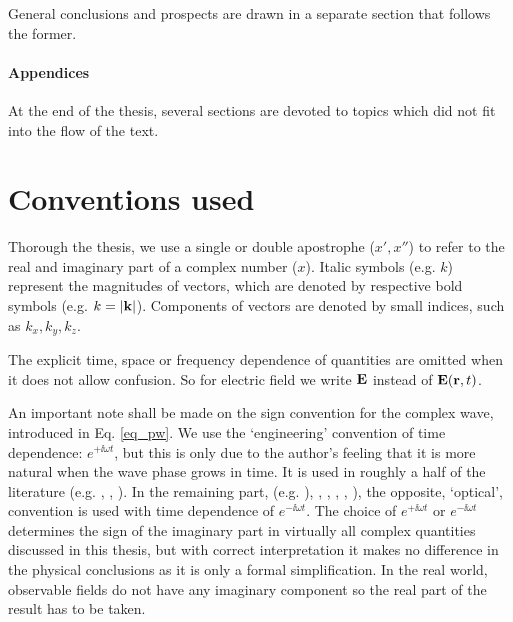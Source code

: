 General conclusions and prospects are drawn in a separate section that follows the former.
\paragraph{Appendices} %
At the end of the thesis, several sections are devoted to topics which did not fit into the flow of the text. 




\section{Conventions used}%
Thorough the thesis, we use a single or double apostrophe ($x', x''$) to refer to the real and imaginary part of a complex number ($x$). Italic symbols (e.g. $k$) represent the magnitudes of vectors, which are denoted by respective bold symbols (e.g. $k = |{\mathbf{k}}|$). Components of vectors are denoted by small indices, such as $k_x, k_y, k_z$.

The explicit time, space or frequency dependence of quantities are omitted when it does not allow confusion. So for electric field we write $\mathbf{E}$ instead of $\mathbf{E}({\mathbf{r}},t)$.

An important note shall be made on the sign convention for the complex wave, introduced in Eq. \ref{eq_pw}.
We use the `engineering' convention of time dependence: $e^{+\ii \omega t}$, but this is only due to the author's feeling that it is more natural when the wave phase grows in time. 
It is used in  roughly a half of the literature (e.g. \cite[p. 9]{engheta2006book}, \cite[pp. 21, 99]{krowne2007book}, \cite[(Chapters 1-4, 6, 9, 10)]{eleftheriades2005book}).  In the remaining part, (e.g. \cite[(Chapters 5, 7, 8)]{eleftheriades2005book}), \cite{klingshirn2007semiconductor}, \cite{jackson1962book}, \cite{veselago1968}, \cite{born1999book}, \cite[p. 5]{noginov2011book}), the opposite, `optical', convention is used with time dependence of $e^{-\ii \omega t}$. The choice of $e^{+\ii\omega t}$ or $e^{-\ii\omega t}$ determines the sign of the imaginary part in virtually all complex quantities discussed in this thesis, but with correct interpretation it makes no difference in the physical conclusions as it is only a formal simplification.
In the real world, observable fields do not have any imaginary component so the real part of the result has to be taken. 

